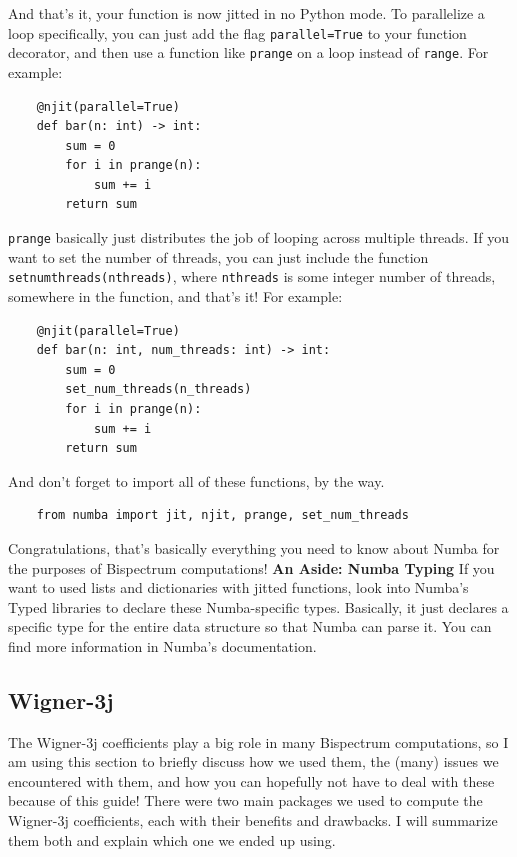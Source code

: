 \documentclass[11pt]{article}
\renewcommand{\_}[1]{\underline{ #1 }}
\newcommand{\npar}{\vspace{.3cm}\newline}
\begin{document}
{And that's it, your function is now jitted in no Python mode. To parallelize a loop specifically, you can just add the flag \texttt{parallel=True} to your function decorator, and then use a function like \texttt{prange} on a loop instead of \texttt{range}. For example:
\begin{verbatim}
    @njit(parallel=True)
    def bar(n: int) -> int:
        sum = 0
        for i in prange(n):
            sum += i
        return sum
\end{verbatim}

\texttt{prange} basically just distributes the job of looping across multiple threads. If you want to set the number of threads, you can just include the function \texttt{set\textunderscore num\textunderscore threads(n\textunderscore threads)}, where \texttt{n\textunderscore threads} is some integer number of threads, somewhere in the function, and that's it! For example:
\begin{verbatim}
    @njit(parallel=True)
    def bar(n: int, num_threads: int) -> int:
        sum = 0
        set_num_threads(n_threads)
        for i in prange(n):
            sum += i
        return sum
\end{verbatim}

And don't forget to import all of these functions, by the way.
\begin{verbatim}
    from numba import jit, njit, prange, set_num_threads
\end{verbatim}

Congratulations, that's basically everything you need to know about Numba for the purposes of Bispectrum computations!
%
\npar
\textbf{An Aside: Numba Typing}
\npar
If you want to used lists and dictionaries with jitted functions, look into Numba's Typed libraries to declare these Numba-specific types. Basically, it just declares a specific type for the entire data structure so that Numba can parse it. You can find more information in Numba's documentation.

\subsection{Wigner-3j}\label{wigner}

The Wigner-3j coefficients play a big role in many Bispectrum computations, so I am using this section to briefly discuss how we used them, the (many) issues we encountered with them, and how you can hopefully not have to deal with these because of this guide!
\npar
There were two main packages we used to compute the Wigner-3j coefficients, each with their benefits and drawbacks. I will summarize them both and explain which one we ended up using.

}
\end{document}
